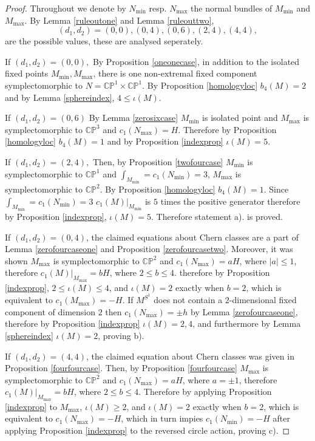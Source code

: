 \documentclass[12pt]{article}
\begin{document}
\begin{proof}

Throughout we denote by $N_{\min}$ resp. $N_{\max}$ the normal bundles of $M_{\min}$ and $M_{\max}$. By Lemma \ref{ruleoutone} and Lemma \ref{ruleouttwo}, $$(d_1,d_2) = (0,0),(0,4),(0,6),(2,4),(4,4),$$ are the possible values, these are analysed seperately. 

If $(d_1,d_2) = (0,0),$ By Proposition \ref{oneonecase}, in addition to the isolated fixed points $M_{\min},M_{\max}$, there is one non-extremal fixed component symplectomorphic to $N=\mathbb{CP}^1 \times \mathbb{CP}^1$. By Proposition \ref{homologyloc} $b_{4}(M)=2$ and by Lemma \ref{sphereindex}, $4 \leq \iota(M) $.



If $(d_1,d_2) = (0,6)$ By Lemma \ref{zerosixcase} $M_{\min}$ is isolated point and $M_{\max}$ is symplectomorphic to $\mathbb{CP}^3$ and $c_{1}(N_{\max})= H$. Therefore by Proposition \ref{homologyloc} $b_{4}(M)=1$ and by Proposition \ref{indexprop} $\iota(M) = 5$. 

If $(d_1,d_2) =(2,4),$ Then, by Proposition \ref{twofourcase} $M_{\min}$ is symplectomorphic to $\mathbb{CP}^1$ and $\int_{M_{\min}} = c_{1}(N_{\min}) = 3$, $M_{\max}$ is symplectomorphic to $\mathbb{CP}^2$. By Proposition \ref{homologyloc}  $b_{4}(M)=1$.  Since  $\int_{M_{\min}} = c_{1}(N_{\min}) = 3$ $c_{1}(M)|_{M_{\min}}$ is $5$ times the positive generator therefore by Proposition \ref{indexprop}, $\iota(M) = 5$. Therefore statement a). is proved.


If $(d_1,d_2) = (0,4)$, the claimed equations about Chern classes are a part of Lemma \ref{zerofourcaseone} and Proposition \ref{zerofourcasetwo}. Moreover, it was shown $M_{\max}$ is symplectomorphic to $\mathbb{CP}^2$ and $c_{1}(N_{\max}) = aH$, where $|a| \leq 1$, therefore $c_{1}(M)|_{M_{\max}} = bH$, where $2 \leq b \leq 4$.  therefore by Proposition \ref{indexprop}, $ 2 \leq \iota(M) \leq 4$, and $\iota(M)=2$ exactly when $b=2$, which is equivalent to $c_{1}(M_{\max})=-H$. If $M^{S^1}$ does not contain a $2$-dimensional fixed component of dimension $2$ then $c_{1}(N_{\max})=\pm h$ by Lemma \ref{zerofourcaseone}, therefore by Proposition \ref{indexprop} $\iota(M)=2,4$, and furthermore by Lemma \ref{sphereindex} $\iota(M)=2$,  proving b). 

If  $(d_1,d_2) =(4,4)$, the claimed equation about Chern classes was given in Proposition \ref{fourfourcase}.  Then, by Proposition \ref{fourfourcase} $M_{\max}$ is symplectomorphic to $\mathbb{CP}^2$ and $c_{1}(N_{\max}) = aH$, where $a = \pm 1$, therefore $c_{1}(M)|_{M_{\max}} = bH$, where $2 \leq b \leq 4$. Therefore by applying Proposition \ref{indexprop} to $M_{\max}$, $\iota(M) \geq 2$,  and $\iota(M)=2$ exactly when $b=2$, which is equivalent to $c_{1}(N_{\max})=-H$, which in turn impies $c_{1}(N_{\min})=-H$ after applying  Proposition \ref{indexprop}  to the reversed circle action,  proving c). \end{proof}
\end{document}
